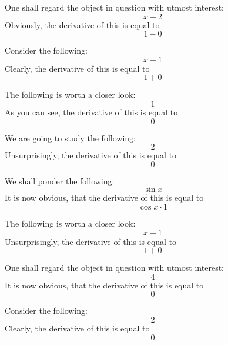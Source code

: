 \documentclass{article}
\begin{document}
One shall regard the object in question with utmost interest:
\begin{equation}
x - 2 
\end{equation}
Obviously, the derivative of this is equal to
\begin{equation}
1 - 0 
\end{equation}

Consider the following:
\begin{equation}
x + 1 
\end{equation}
Clearly, the derivative of this is equal to
\begin{equation}
1 + 0 
\end{equation}

The following is worth a closer look:
\begin{equation}
1 
\end{equation}
As you can see, the derivative of this is equal to
\begin{equation}
0 
\end{equation}

We are going to study the following:
\begin{equation}
2 
\end{equation}
Unsurprisingly, the derivative of this is equal to
\begin{equation}
0 
\end{equation}

We shall ponder the following:
\begin{equation}
\sin x 
\end{equation}
It is now obvious, that the derivative of this is equal to
\begin{equation}
\cos x \cdot 1 
\end{equation}

The following is worth a closer look:
\begin{equation}
x + 1 
\end{equation}
Unsurprisingly, the derivative of this is equal to
\begin{equation}
1 + 0 
\end{equation}

One shall regard the object in question with utmost interest:
\begin{equation}
4 
\end{equation}
It is now obvious, that the derivative of this is equal to
\begin{equation}
0 
\end{equation}

Consider the following:
\begin{equation}
2 
\end{equation}
Clearly, the derivative of this is equal to
\begin{equation}
0 
\end{equation}
\end{document}

